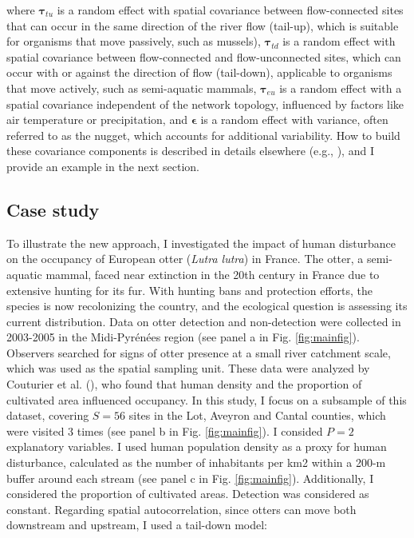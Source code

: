 \documentclass[
  11pt,
  a4paper,
]{article}
\begin{document}
where \(\boldsymbol{\tau}_{tu}\) is a random effect with spatial covariance between flow-connected sites that can occur in the same direction of the river flow (tail-up), which is suitable for organisms that move passively, such as mussels), \(\boldsymbol{\tau}_{td}\) is a random effect with spatial covariance between flow-connected and flow-unconnected sites, which can occur with or against the direction of flow (tail-down), applicable to organisms that move actively, such as semi-aquatic mammals, \(\boldsymbol{\tau}_{eu}\) is a random effect with a spatial covariance independent of the network topology, influenced by factors like air temperature or precipitation, and \(\boldsymbol{\epsilon}\) is a random effect with variance, often referred to as the nugget, which accounts for additional variability. How to build these covariance components is described in details elsewhere (e.g., ), and I provide an example in the next section.

\subsection{Case study}\label{case-study}

To illustrate the new approach, I investigated the impact of human disturbance on the occupancy of European otter (\emph{Lutra lutra}) in France. The otter, a semi-aquatic mammal, faced near extinction in the 20th century in France due to extensive hunting for its fur. With hunting bans and protection efforts, the species is now recolonizing the country, and the ecological question is assessing its current distribution. Data on otter detection and non-detection were collected in 2003-2005 in the Midi-Pyrénées region (see panel a in Fig. \ref{fig:mainfig}). Observers searched for signs of otter presence at a small river catchment scale, which was used as the spatial sampling unit. These data were analyzed by Couturier et al. (), who found that human density and the proportion of cultivated area influenced occupancy. In this study, I focus on a subsample of this dataset, covering \(S = 56\) sites in the Lot, Aveyron and Cantal counties, which were visited 3 times (see panel b in Fig. \ref{fig:mainfig}). I consided \(P = 2\) explanatory variables. I used human population density as a proxy for human disturbance, calculated as the number of inhabitants per km2 within a 200-m buffer around each stream (see panel c in Fig. \ref{fig:mainfig}). Additionally, I considered the proportion of cultivated areas. Detection was considered as constant. Regarding spatial autocorrelation, since otters can move both downstream and upstream, I used a tail-down model:
\end{document}
